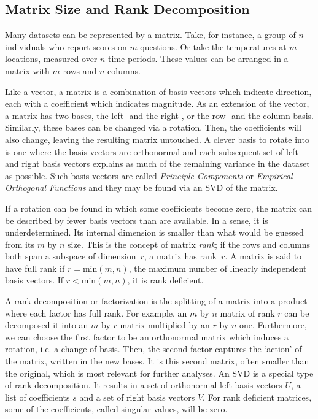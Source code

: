 \documentclass[sigconf]{acmart}
\begin{document}
\subsection{Matrix Size and Rank Decomposition}
\label{sec:Introduction Matrix Size and Rank Decomposition}

Many datasets can be represented by a matrix. Take, for instance, a group of $n$ individuals who report scores on $m$ questions. Or take the temperatures at $m$ locations, measured over $n$ time periods. These values can be arranged in a matrix with $m$ rows and $n$ columns.

Like a vector, a matrix is a combination of basis vectors which indicate direction, each with a coefficient which indicates magnitude. As an extension of the vector, a matrix has two bases, the left- and the right-, or the row- and the column basis. Similarly, these bases can be changed via a rotation. Then, the coefficients will also change, leaving the resulting matrix untouched. A clever basis to rotate into is one where the basis vectors are orthonormal and each subsequent set of left- and right basis vectors explains as much of the remaining variance in the dataset as possible. Such basis vectors are called \textit{Principle Components} or \textit{Empirical Orthogonal Functions} and they may be found via an SVD of the matrix.

If a rotation can be found in which some coefficients become zero, the matrix can be described by fewer basis vectors than are available. In a sense, it is underdetermined. Its internal dimension is smaller than what would be guessed from its $m$ by $n$ size. This is the concept of matrix \textit{rank}; if the rows and columns both span a subspace of dimension~$r$, a matrix has rank~$r$. A matrix is said to have full rank if $r = \text{min}(m, n)$, the maximum number of linearly independent basis vectors. If $r < \text{min}(m, n)$, it is rank deficient.

A rank decomposition or factorization is the splitting of a matrix into a product where each factor has full rank. For example, an $m$ by $n$ matrix of rank $r$ can be decomposed it into an $m$ by $r$ matrix multiplied by an $r$ by $n$ one. Furthermore, we can choose the first factor to be an orthonormal matrix which induces a rotation, i.e. a change-of-basis. Then, the second factor captures the `action' of the matrix, written in the new bases. It is this second matrix, often smaller than the original, which is most relevant for further analyses. An SVD is a special type of rank decomposition. It results in a set of orthonormal left basis vectors $U$, a list of coefficients $s$ and a set of right basis vectors $V$. For rank deficient matrices, some of the coefficients, called singular values, will be zero.
\end{document}
